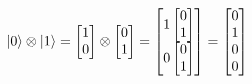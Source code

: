 \documentclass[11pt, fleqn]{article}
\begin{document}
$|0\rangle \otimes |1\rangle=
\begin{bmatrix}1\\0 \end{bmatrix}\otimes
\begin{bmatrix}0\\1 \end{bmatrix}=
\begin{bmatrix}1\begin{bmatrix}0\\1 \end{bmatrix}\\0\begin{bmatrix}0\\1 \end{bmatrix}\end{bmatrix}=
\begin{bmatrix}0\\1\\0\\0 \end{bmatrix}
\\~\\$
\end{document}
